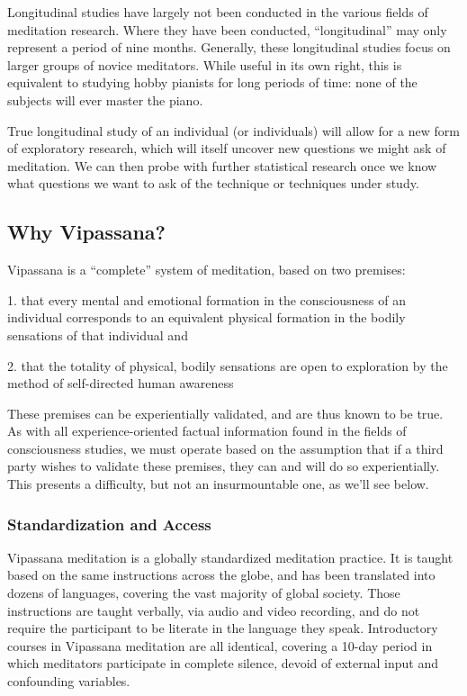 \documentclass[a4paper, amsfonts, amssymb, amsmath, reprint, showkeys, nofootinbib, twoside]{revtex4-1}
\begin{document}
Longitudinal studies have largely not been conducted in the various fields
of meditation research.
Where they have been conducted, ``longitudinal'' may only represent a period
of nine months.
Generally, these longitudinal studies focus on larger groups of novice meditators.
While useful in its own right, this is equivalent to studying hobby pianists
for long periods of time: none of the subjects will ever master the piano.

True longitudinal study of an individual (or individuals) will allow for a
new form of exploratory research, which will itself uncover new questions
we might ask of meditation.
We can then probe with further statistical research once we know what
questions we want to ask of the technique or techniques under study.

\subsection{Why Vipassana?}

Vipassana is a ``complete'' system of meditation, based on two premises:

1. that every mental and emotional formation in the consciousness of an individual
corresponds to an equivalent physical formation in the bodily sensations
of that individual and

2. that the totality of physical, bodily sensations are open to exploration by
the method of self-directed human awareness

These premises can be experientially validated, and are thus known to be true.
As with all experience-oriented factual information found in the fields of
consciousness studies, we must operate based on the assumption that if a
third party wishes to validate these premises, they can and will do so
experientially.
This presents a difficulty, but not an insurmountable one, as we'll see below.

\subsubsection{Standardization and Access}

Vipassana meditation is a globally standardized meditation practice.
It is taught based on the same instructions across the globe,
and has been translated into dozens of languages, covering the vast
majority of global society.
Those instructions are taught verbally, via audio and video recording,
and do not require the participant to be literate in the language they speak.
Introductory courses in Vipassana meditation are all identical, covering
a 10-day period in which meditators participate in complete silence,
devoid of external input and confounding variables.
\end{document}
